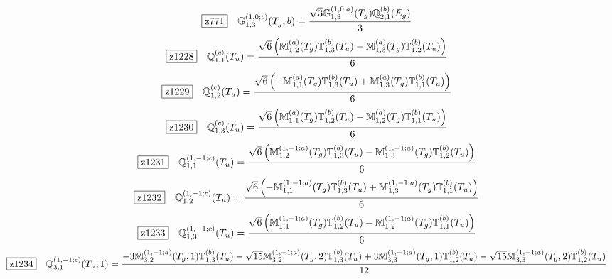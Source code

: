 \documentclass[fleqn,10pt,landscape]{jsarticle}
\begin{document}
\begin{dmath*}
\hspace*{3mm}\fbox{z771}\quad \mathbb{G}_{1,3}^{(1,0;c)}(T_{g},b)=\frac{\sqrt{3} \mathbb{G}_{1,3}^{(1,0;a)}(T_{g}) \mathbb{Q}_{2,1}^{(b)}(E_{g})}{3}
\end{dmath*}
\begin{dmath*}
\hspace*{3mm}\fbox{z1228}\quad \mathbb{Q}_{1,1}^{(c)}(T_{u})=\frac{\sqrt{6} \left(\mathbb{M}_{1,2}^{(a)}(T_{g}) \mathbb{T}_{1,3}^{(b)}(T_{u}) - \mathbb{M}_{1,3}^{(a)}(T_{g}) \mathbb{T}_{1,2}^{(b)}(T_{u})\right)}{6}
\end{dmath*}
\begin{dmath*}
\hspace*{3mm}\fbox{z1229}\quad \mathbb{Q}_{1,2}^{(c)}(T_{u})=\frac{\sqrt{6} \left(- \mathbb{M}_{1,1}^{(a)}(T_{g}) \mathbb{T}_{1,3}^{(b)}(T_{u}) + \mathbb{M}_{1,3}^{(a)}(T_{g}) \mathbb{T}_{1,1}^{(b)}(T_{u})\right)}{6}
\end{dmath*}
\begin{dmath*}
\hspace*{3mm}\fbox{z1230}\quad \mathbb{Q}_{1,3}^{(c)}(T_{u})=\frac{\sqrt{6} \left(\mathbb{M}_{1,1}^{(a)}(T_{g}) \mathbb{T}_{1,2}^{(b)}(T_{u}) - \mathbb{M}_{1,2}^{(a)}(T_{g}) \mathbb{T}_{1,1}^{(b)}(T_{u})\right)}{6}
\end{dmath*}
\begin{dmath*}
\hspace*{3mm}\fbox{z1231}\quad \mathbb{Q}_{1,1}^{(1,-1;c)}(T_{u})=\frac{\sqrt{6} \left(\mathbb{M}_{1,2}^{(1,-1;a)}(T_{g}) \mathbb{T}_{1,3}^{(b)}(T_{u}) - \mathbb{M}_{1,3}^{(1,-1;a)}(T_{g}) \mathbb{T}_{1,2}^{(b)}(T_{u})\right)}{6}
\end{dmath*}
\begin{dmath*}
\hspace*{3mm}\fbox{z1232}\quad \mathbb{Q}_{1,2}^{(1,-1;c)}(T_{u})=\frac{\sqrt{6} \left(- \mathbb{M}_{1,1}^{(1,-1;a)}(T_{g}) \mathbb{T}_{1,3}^{(b)}(T_{u}) + \mathbb{M}_{1,3}^{(1,-1;a)}(T_{g}) \mathbb{T}_{1,1}^{(b)}(T_{u})\right)}{6}
\end{dmath*}
\begin{dmath*}
\hspace*{3mm}\fbox{z1233}\quad \mathbb{Q}_{1,3}^{(1,-1;c)}(T_{u})=\frac{\sqrt{6} \left(\mathbb{M}_{1,1}^{(1,-1;a)}(T_{g}) \mathbb{T}_{1,2}^{(b)}(T_{u}) - \mathbb{M}_{1,2}^{(1,-1;a)}(T_{g}) \mathbb{T}_{1,1}^{(b)}(T_{u})\right)}{6}
\end{dmath*}
\begin{dmath*}
\hspace*{3mm}\fbox{z1234}\quad \mathbb{Q}_{3,1}^{(1,-1;c)}(T_{u},1)=\frac{- 3 \mathbb{M}_{3,2}^{(1,-1;a)}(T_{g},1) \mathbb{T}_{1,3}^{(b)}(T_{u}) - \sqrt{15} \mathbb{M}_{3,2}^{(1,-1;a)}(T_{g},2) \mathbb{T}_{1,3}^{(b)}(T_{u}) + 3 \mathbb{M}_{3,3}^{(1,-1;a)}(T_{g},1) \mathbb{T}_{1,2}^{(b)}(T_{u}) - \sqrt{15} \mathbb{M}_{3,3}^{(1,-1;a)}(T_{g},2) \mathbb{T}_{1,2}^{(b)}(T_{u})}{12}
\end{dmath*}
\end{document}
